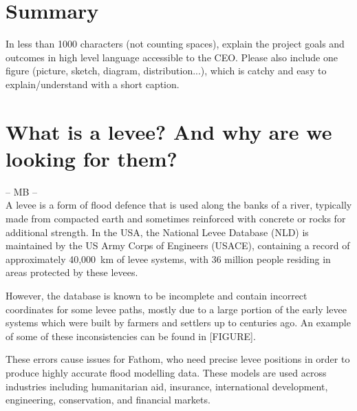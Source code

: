 \documentclass[NOTE, disdraft=true, UKenglish]{\DISCDTLATEXPATH UCLCDTDISdoc}
\begin{document}
\maketitle

\tableofcontents

\clearpage


\newpage
\section{Summary}
\label{sec:summary}
In less than 1000 characters (not counting spaces), explain the project goals and outcomes in high level  language accessible to the CEO. Please also include one figure (picture, sketch, diagram, distribution...), which is catchy and easy to explain/understand with a short caption.

\newpage
\section{What is a levee? And why are we looking for them?}
\label{sec:introduction}
%
-- MB --\\
A levee is a form of flood defence that is used along the banks of a river, typically made from compacted earth and sometimes reinforced with concrete or rocks for additional strength. In the USA, the National Levee Database (NLD) is maintained by the US Army Corps of Engineers (USACE), containing a record of approximately 40,000~km of levee systems, with 36 million people residing in areas protected by these levees.

However, the database is known to be incomplete and contain incorrect coordinates for some levee paths, mostly due to a large portion of the early levee systems which were built by farmers and settlers up to centuries ago. An example of some of these inconsistencies can be found in [FIGURE].

These errors cause issues for Fathom, who need precise levee positions in order to produce highly accurate flood modelling data. These models are used across industries including humanitarian aid, insurance, international development, engineering, conservation, and financial markets.
\end{document}
